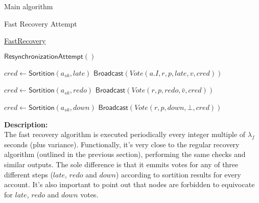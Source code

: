 \documentclass[10pt,a4paper]{article}
\begin{document}
\begin{section}{Main algorithm}
\begin{subsection}{Fast Recovery Attempt}
    \begin{algorithm}[H]
        \caption{\underline{FastRecovery}}
        \label{algo:fast-recovery}
        \begin{algorithmic}[1]


        \State $\mathsf{ResynchronizationAttempt}()$
    
                \State $cred \gets 
                \mathsf{Sortition}(a_{sk}, late)$
                    \State $\mathsf{Broadcast}(Vote(a.I, r, p, late, v, cred))$
                \EndIf

                    \State $cred \gets 
                    \mathsf{Sortition}(a_{sk}, redo)$
                        \State $\mathsf{Broadcast}(Vote(r,p,redo,\bar{v}, cred))$
                    \EndIf

            \Else
                \State $cred \gets 
                \mathsf{Sortition}(a_{sk}, down)$
                    \State $\mathsf{Broadcast}(Vote(r,p,down,\bot, cred))$
                \EndIf
            \EndIf
        \EndFor

        \EndFunction
        \end{algorithmic}
    \end{algorithm}
    
    
    \noindent \textbf{Description:}\\
    The fast recovery algorithm is executed periodically every integer multiple of $\lambda_f$
    seconds (plus variance).
    Functionally, it's very close to the regular recovery algorithm (outlined in the previous section), 
    performing the same checks and similar outputs. The sole difference is that it emmits votes 
    for any of three different steps ($late$, $redo$ and $down$) according to sortition 
    results for every account.
    It's also important to point out that nodes are forbidden to equivocate for $late$, $redo$ and $down$ votes.
\end{subsection}


\end{section}
\end{document}
